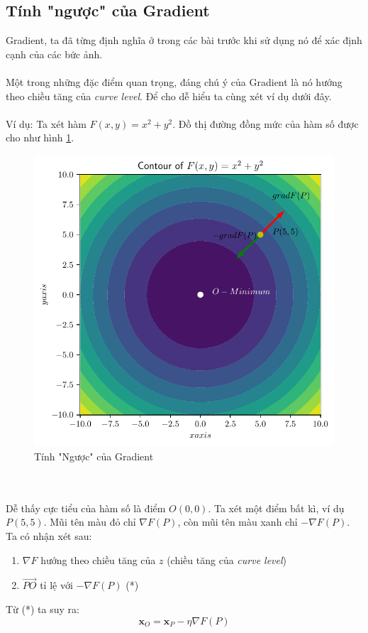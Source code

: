 \documentclass{article}
\begin{document}
\subsection{Tính "ngược" của Gradient}
Gradient, ta đã từng định nghĩa ở trong các bài trước khi sử dụng nó để xác định cạnh của các bức ảnh. 
\\\\
Một trong những đặc điểm quan trọng, đáng chú ý của Gradient là nó hướng theo chiều tăng của \textit{curve level}. Để cho dễ hiểu ta cùng xét ví dụ dưới đây.
\\\\
Ví dụ: Ta xét hàm $F(x,y) = x^2+y^2$. Đồ thị đường đồng mức của hàm số được cho như hình \ref{fig2}.
\begin{figure}[ht!]
    \centering
    \includegraphics[width = 0.7\linewidth]{gd1.pdf}
    \caption{Tính "Ngược" của Gradient}
    \label{fig2}
\end{figure}
\phantom{a}\\\\
Dễ thấy cực tiểu của hàm số là điểm $O(0,0)$. Ta xét một điểm bất kì, ví dụ $P(5,5)$. Mũi tên màu đỏ chỉ $\nabla F(P)$, còn mũi tên màu xanh chỉ $-\nabla F(P)$. Ta có nhận xét sau:
\begin{enumerate}
    \item $\nabla F$ hướng theo chiều tăng của $z$ (chiều tăng của \textit{curve level})
    \item $\overrightarrow{PO}$ tỉ lệ với $-\nabla F(P)$ (*)
\end{enumerate}
Từ (*) ta suy ra: 
\begin{equation}
    \textbf{x}_O = \textbf{x}_P - \eta{\nabla F(P)}
    \label{eq2}
\end{equation}
\end{document}
